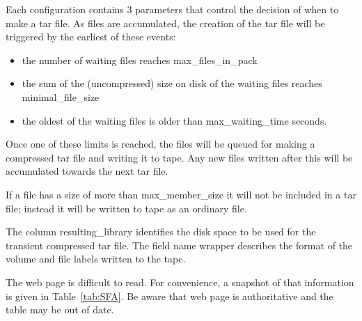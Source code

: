 Each configuration contains 3 parameters that control the decision of when to make a tar file.
As files are accumulated, the creation of the tar file will be triggered by the earliest of
these events:
\begin{itemize}
  \item the number of waiting files reaches max\_files\_in\_pack
  \item the sum of the (uncompressed) size on disk of the waiting files reaches minimal\_file\_size
  \item the oldest of the waiting files is older than max\_waiting\_time seconds.
\end{itemize}
Once one of these limits is reached, the files will be queued for making a compressed tar
file and writing it to tape.  Any new files written after this will be accumulated towards
the next tar file.

If a file has a size of more than max\_member\_size it will not be included in a tar file;
instead it will be written to tape as an ordinary file.

The column resulting\_library identifies the disk space to be used for
the transient compressed tar file.
The field name wrapper describes the format of the volume and file labels written to the tape.

The web page is difficult to read.  For convenience, a snapshot of that information is given
in Table~\ref{tab:SFA}.  Be aware that web page is authoritative and the table may be out of date.

